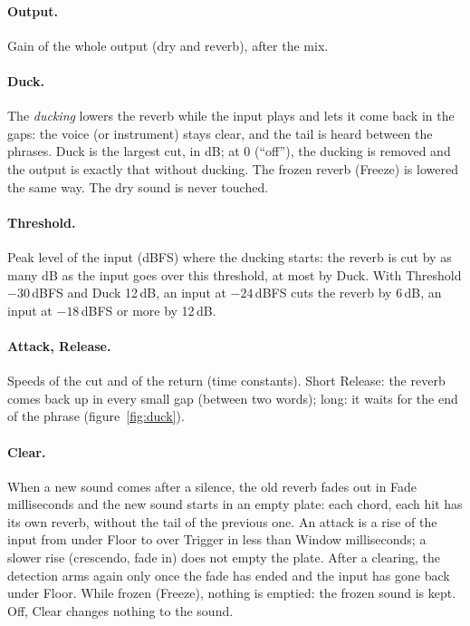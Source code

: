 \documentclass[a4paper,11pt]{article}
\newcommand{\dB}{\,dB}
\newcommand{\dBFS}{\,dBFS}
\begin{document}
\paragraph{Output.} Gain of the whole output (dry and reverb), after the mix.

\paragraph{Duck.} The \emph{ducking} lowers the reverb while the input plays and lets it come
back in the gaps: the voice (or instrument) stays clear, and the tail is heard between the
phrases. Duck is the largest cut, in dB; at 0 (``off''), the ducking is removed and the
output is exactly that without ducking. The frozen reverb (Freeze) is lowered the same way. The
dry sound is never touched.

\paragraph{Threshold.} Peak level of the input (dBFS) where the ducking starts: the reverb is
cut by as many dB as the input goes over this threshold, at most by Duck. With Threshold
$-30$\dBFS{} and Duck 12\dB, an input at $-24$\dBFS{} cuts the reverb by 6\dB, an input at
$-18$\dBFS{} or more by 12\dB.

\paragraph{Attack, Release.} Speeds of the cut and of the return (time constants). Short
Release: the reverb comes back up in every small gap (between two words); long: it waits for the
end of the phrase (figure~\ref{fig:duck}).

\paragraph{Clear.} When a new sound comes after a silence, the old reverb fades out in Fade
milliseconds and the new sound starts in an empty plate: each chord, each hit has its own
reverb, without the tail of the previous one. An attack is a rise of the input from under Floor
to over Trigger in less than Window milliseconds; a slower rise (crescendo, fade in) does not
empty the plate. After a clearing, the detection arms again only once the fade has ended and
the input has gone back under Floor. While frozen (Freeze), nothing is emptied: the frozen sound
is kept. Off, Clear changes nothing to the sound.
\end{document}
